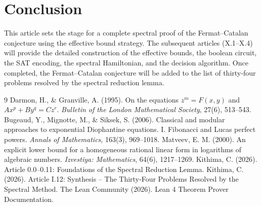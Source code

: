 \documentclass[11pt,a4paper]{article}
\begin{document}
\section{Conclusion}

This article sets the stage for a complete spectral proof of the Fermat–Catalan conjecture using the effective bound strategy. The subsequent articles (X.1–X.4) will provide the detailed construction of the effective bounds, the boolean circuit, the SAT encoding, the spectral Hamiltonian, and the decision algorithm. Once completed, the Fermat–Catalan conjecture will be added to the list of thirty‑four problems resolved by the spectral reduction lemma.


\begin{thebibliography}{9}
  Darmon, H., \& Granville, A. (1995). On the equations \(z^m = F(x,y)\) and \(Ax^p + By^q = Cz^r\). \emph{Bulletin of the London Mathematical Society}, 27(6), 513–543.
  Bugeaud, Y., Mignotte, M., \& Siksek, S. (2006). Classical and modular approaches to exponential Diophantine equations. I. Fibonacci and Lucas perfect powers. \emph{Annals of Mathematics}, 163(3), 969–1018.
  Matveev, E. M. (2000). An explicit lower bound for a homogeneous rational linear form in logarithms of algebraic numbers. \emph{Izvestiya: Mathematics}, 64(6), 1217–1269.
  Kithima, C. (2026). Article 0.0–0.11: Foundations of the Spectral Reduction Lemma.
  Kithima, C. (2026). Article I.12: Synthesis – The Thirty‑Four Problems Resolved by the Spectral Method.
  The Lean Community (2026). Lean 4 Theorem Prover Documentation.
\end{thebibliography}
\end{document}
